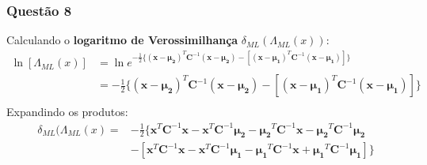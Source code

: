 \documentclass{beamer}\usepackage[]{graphicx}\usepackage[]{color}
\begin{document}
		\begin{frame}
			\frametitle{Questão 8}
			Calculando o \textbf{logaritmo de Verossimilhança} $\delta_{ML}(\Lambda_{ML}(x))$:
			\begin{align*}
				\ln[\Lambda_{ML}(x)] &= \ln{e^{-\frac{1}{2}\{(\boldsymbol{x} - \boldsymbol{\mu_{2}})^{T}\boldsymbol{C}^{-1}(\boldsymbol{x} - \boldsymbol{\mu_{2}}) - [(\boldsymbol{x} - \boldsymbol{\mu_{1}})^{T}\boldsymbol{C}^{-1}(\boldsymbol{x} - \boldsymbol{\mu_{1}})]\}}}\\
				&= -\frac{1}{2}\{(\boldsymbol{x} - \boldsymbol{\mu_{2}})^{T}\boldsymbol{C}^{-1}(\boldsymbol{x} - \boldsymbol{\mu_{2}}) - [(\boldsymbol{x} - \boldsymbol{\mu_{1}})^{T}\boldsymbol{C}^{-1}(\boldsymbol{x} - \boldsymbol{\mu_{1}})]\}\\
			\end{align*}
			Expandindo os produtos:
			\begin{align*}
				\delta_{ML}(\Lambda_{ML}(x)= &-\frac{1}{2}\{ \boldsymbol{x}^{T}\boldsymbol{C}^{-1}\boldsymbol{x} - \boldsymbol{x}^{T}\boldsymbol{C}^{-1}\boldsymbol{\mu_{2}} - \boldsymbol{\mu_{2}}^{T}\boldsymbol{C}^{-1}\boldsymbol{x} - 
				\boldsymbol{\mu_{2}}^{T}\boldsymbol{C}^{-1}\boldsymbol{\mu_{2}}\\
				&-[\boldsymbol{x}^{T}\boldsymbol{C}^{-1}\boldsymbol{x} - 
				\boldsymbol{x}^{T}\boldsymbol{C}^{-1}\boldsymbol{\mu_{1}} - 
				\boldsymbol{\mu_{1}}^{T}\boldsymbol{C}^{-1}\boldsymbol{x} + 
				\boldsymbol{\mu_{1}}^{T}\boldsymbol{C}^{-1}\boldsymbol{\mu_{1}}]\}
			\end{align*}
		\end{frame}
	
\end{document}
